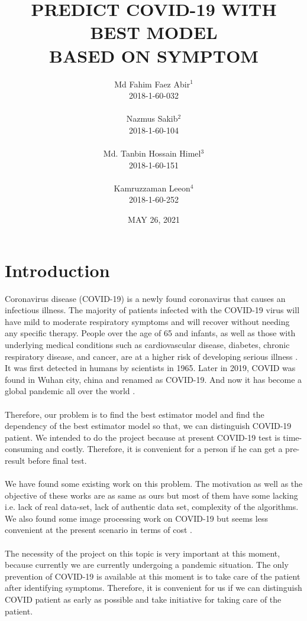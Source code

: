 \documentclass[letterpaper,11pt]{article}
\title{PREDICT COVID-19 WITH BEST MODEL\\ BASED ON SYMPTOM }
\author{%
Md Fahim Faez Abir$^{1}$ \\
2018-1-60-032\\
\\
Nazmus Sakib$^{2}$ \\ 
2018-1-60-104\\
\\
Md. Tanbin Hossain Himel$^{3}$ \\
2018-1-60-151\\
\\
Kamruzzaman Leeon$^{4}$ \\ 
2018-1-60-252\\
}
\date{MAY 26, 2021}
\begin{document}
\maketitle


\setlength{\parindent}{0em}
\setlength{\parskip}{1em}

\section{Introduction}

Coronavirus disease (COVID-19) is a newly found coronavirus that causes an infectious illness. The majority of patients infected with the COVID-19 virus will have mild to moderate respiratory symptoms and will recover without needing any specific therapy. People over the age of 65 and infants, as well as those with underlying medical conditions such as cardiovascular disease, diabetes, chronic respiratory disease, and cancer, are at a higher risk of developing serious illness \cite{who_web1}. It was first detected in humans by scientists in 1965.  Later in 2019, COVID was found in Wuhan city, china and renamed as COVID-19. And now it has become a global pandemic all over the world \cite{web_md6}.\\
\\
Therefore, our problem is to find the best estimator model and find the dependency of the best estimator model so that, we can distinguish COVID-19 patient. We intended to do the project because at present COVID-19 test is time-consuming and costly. Therefore, it is convenient for a person if he can get a pre-result before final test.\\
\\
We have found some existing work on this problem. The motivation as well as the objective of these works are as same as ours but most of them have some lacking i.e. lack of real data-set, lack of authentic data set, complexity of the algorithms. We also found some image processing work on COVID-19 but seems less convenient at the present scenario in terms of cost \cite{Xray}. \\
\\
The necessity of the project on this topic is very important at this moment, because currently we are currently undergoing a pandemic situation. The only prevention of COVID-19 is available at this moment is to take care of the patient after identifying symptoms. Therefore, it is convenient for us if we can distinguish COVID patient as early as possible and take initiative for taking care of the patient.
\\
\end{document}
